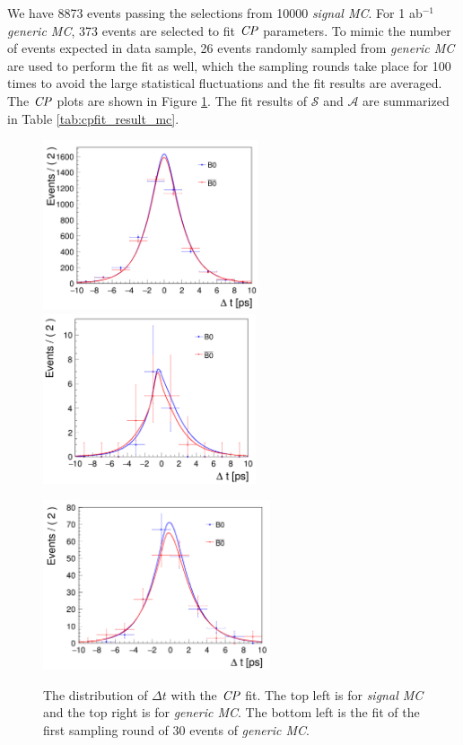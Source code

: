 We have 8873 events passing the selections from 10000 \textit{signal MC}. For 1 ab$^{-1}$ \textit{generic MC}, 373 events are selected to fit $\it{CP}$ parameters. To mimic the number of events expected in data sample, 26 events randomly sampled from \textit{generic MC} are used to perform the fit as well, which the sampling rounds take place for 100 times to avoid the large statistical fluctuations and the fit results are averaged. The $\it{CP}$ plots are shown in Figure \ref{fig:cpfitmc}. The fit results of $\mathcal{S}$ and $\mathcal{A}$ are summarized in Table \ref{tab:cpfit_result_mc}.

\begin{figure}[htpb]
	\begin{minipage}[t]{0.5\linewidth}
		\includegraphics[height=5cm]{figures/cpfit-10000sig}
		\includegraphics[height=5cm]{figures/cpfit-30gen}
		\label{fig:cpfit_sig}
	\end{minipage}
	\begin{minipage}[t]{0.5\linewidth}
		\includegraphics[height=5cm]{figures/cpfit-373gen}
		\label{fig:cpfit_gen}
	\end{minipage}
\caption{The distribution of $\Delta t$ with the $\it{CP}$ fit. The top left is for \textit{signal MC} and the top right is for \textit{generic MC}. The bottom left is the fit of the first sampling round of 30 events of \textit{generic MC}.  }
\label{fig:cpfitmc}
\end{figure}


